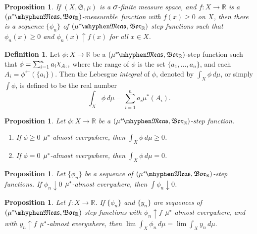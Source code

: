 \documentclass[
twoside=true,
paper=letter,
fontsize=11pt,
pagesize=auto,
leqno,
openany,
headsepline,
overfullrule,
]{scrbook}
\theoremstyle{plain}
\theoremstyle{plain}
\newtheorem{prop}[thm]{Proposition}
\theoremstyle{definition}
\newtheorem{defn}[thm]{Definition}
\theoremstyle{bfnoteitalic}
\theoremstyle{bfnoteroman}
\newcommand{\sigalg}[1]{\mathfrak{#1}}
\newcommand{\borel}{\mathfrak{Bor}}
\newcommand{\textsigma}{\hbox{\large{$\sigma$}}\kern-1pt}
\newcommand{\charfunction}[1]{{\raisebox{2pt}{$\chi$}}_{#1}}
\newcommand{\preimage}[1]{#1^{\leftarrow}}
\newcommand{\R}{\mathbb{R}}
\newcommand{\semiring}{\sigalg{S}}
\newcommand{\measurable}[1]{{#1}\mhyphen\mathfrak{Meas}}
\newcommand{\kernast}{\ast\kern-1pt}
\newcommand{\mbmeasurable}{$(\measurable{\measure^\kernast},\borel_\R)$\hyp{}measurable}
\newcommand{\measurespace}{X}
\newcommand{\mspaceeltii}{y}
\newcommand{\measure}{\mu}
\begin{document}
\begin{prop}\label{sigma_finite_step_functions}
If $(\measurespace, \semiring, \measure)$ is a $\textsigma$-finite measure space, and $f:\measurespace\to\R$ is a \mbmeasurable\ function with $f(x)\geq 0$ on $\measurespace$, 
then there is a sequence $\{\phi_n\}$ of $(\measurable{\measure^\kernast},\borel_\R)$ step functions such that $\phi_n(x)\geq 0$ and $\phi_n(x)\uparrow f(x)$ for all $x\in\measurespace$.
\end{prop}







\begin{defn}\label{integral_step_function}
Let $\phi:\measurespace\to\R$ be a $(\measurable{\measure^\kernast},\borel_\R)$-step function such that $\phi=\sum_{i=1}^{n}a_i\charfunction{A_i},$ where the range of $\phi$ is the set $\{a_1, \ldots, a_n\}$, and each $A_i=\preimage{\phi}(\{ a_i\} )$. Then the Lebesgue \emph{integral}  of $\phi$, denoted by $\int_\measurespace\phi\,d\measure$, or simply $\int \phi$,  is defined to be the real number
\[
\int_\measurespace\phi\,d\measure = \sum_{i=1}^{n}a_i\measure^*(A_i).
\]
\end{defn}


\begin{prop}
Let $\phi:\measurespace\to\R$ be a $(\measurable{\measure^\kernast},\borel_\R)$-step function.
\begin{enumerate}
\item
If $\phi \geq 0$ $\measure^\kernast$-almost everywhere, then 
$\int_\measurespace\phi\,d\measure \geq 0$.
\item
If $\phi = 0$ $\measure^\kernast$-almost everywhere, then 
$\int_\measurespace\phi\,d\measure = 0$.
\end{enumerate}
\end{prop}


\begin{prop}\label{continuity_at_zero}
Let $\{\phi_n\}$ be a sequence of $(\measurable{\measure^\kernast},\borel_\R)$-step functions.  If $\phi_n\downarrow 0$ $\measure^\kernast$-almost everywhere, then $\int \phi_n\downarrow 0$.
\end{prop}



\begin{prop}\label{integral_is_unique}
Let $f:\measurespace\to\R$. If $\{\phi_n\}$ and $\{\mspaceeltii_n\}$ are sequences of $(\measurable{\measure^\kernast},\borel_\R)$-step functions with 
$\phi_n\uparrow f$ $\measure^\kernast$-almost everywhere, and with 
$\mspaceeltii_n\uparrow f$ $\measure^\kernast$-almost everywhere,
then 
$\lim \int_\measurespace\phi_n\,d\measure 
=
\lim \int_\measurespace\mspaceeltii_n\,d\measure.$
\end{prop}
\end{document}
